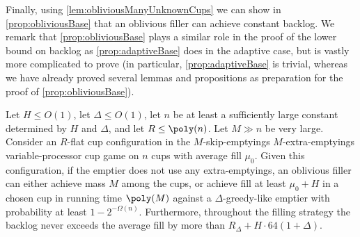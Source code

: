 Finally, using \cref{lem:obliviousManyUnknownCups} we can show in
\cref{prop:obliviousBase} that an oblivious filler can achieve
constant backlog. We remark that \cref{prop:obliviousBase} plays a
similar role in the proof of the lower bound on backlog as
\cref{prop:adaptiveBase} does in the adaptive case, but is vastly
more complicated to prove (in particular,
\cref{prop:adaptiveBase} is trivial, whereas we have already
proved several lemmas and propositions as preparation for the
proof of \cref{prop:obliviousBase}).
\begin{proposition}
  \label{prop:obliviousBase}
  Let $H \le O(1)$, let $\Delta \le O(1)$, let $n$ be at
  least a sufficiently large constant determined by $H$ and
  $\Delta$, and let $R \le \poly(n)$. 
  Let $M \gg n$ be very large.
  Consider an $R$-flat cup configuration in the
  $M$-skip-emptyings $M$-extra-emptyings variable-processor cup
  game on $n$ cups with average fill $\mu_0$.
  Given this configuration, if the emptier does not use any
  extra-emptyings, an oblivious filler can either
  achieve mass $M$ among the cups, or achieve fill at least $\mu_0 + H$
  in a chosen cup in running time $\poly(M)$ against a
  $\Delta$-greedy-like emptier with probability at least $1-2^{-\Omega(n)}.$
  Furthermore, throughout the filling strategy the backlog never
  exceeds the average fill by more than $R_\Delta + H\cdot
  64(1+\Delta)$.
\end{proposition}
